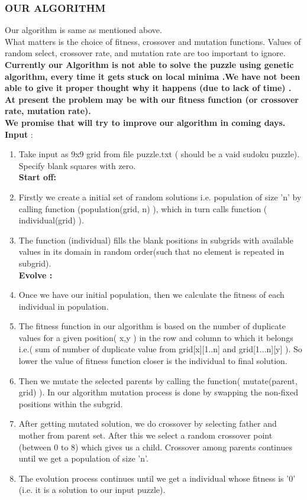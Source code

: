 \documentclass[11pt]{article}
\newcommand\tab[1][1cm]{\hspace*{#1}}
\begin{document}
\subsubsection{OUR ALGORITHM}
\tab Our algorithm is same as mentioned above.\\
\linebreak
What matters is the choice of fitness, crossover and mutation functions. Values of random select, crossover rate, and mutation rate are too important to ignore.\\
\linebreak
	\textbf{Currently our Algorithm is not able to solve the puzzle using genetic algorithm, every time it gets stuck on local minima .We have not been able to give it proper thought why it happens (due to lack of time) . At present the problem may be with our fitness function (or crossover rate, mutation rate).\\
We promise that will try to improve our algorithm in coming days.}\\
\linebreak
\tab \textbf{Input} :
\begin{enumerate}[label = (\roman*)]
\item Take input as 9x9 grid from file puzzle.txt ( should be a vaid sudoku puzzle).
	Specify blank squares with zero.\\
	\textbf{Start off:}
\item Firstly we create a initial set of random solutions i.e. population of size 'n' by calling function (population(grid, n) ), which in turn calls function ( individual(grid) ).
\item The function (individual) fills the blank positions in subgrids with available values in its domain in random order(such that no element is repeated in subgrid).\\
\textbf{Evolve :}
\item Once we have our initial population, then we calculate the fitness of each individual in population.
\item The fitness function in our algorithm is based on the number of duplicate values for a given position( x,y ) in the row and column to which it belongs i.e.( sum of number of duplicate value from grid[x][1..n] and grid[1...n][y] ). So lower the value of fitness function closer is the individual to final solution.
\item Then we mutate the selected parents by calling the function( mutate(parent, grid) ). In our algorithm mutation process is done by swapping the non-fixed positions within the subgrid.
\item After getting mutated solution, we do crossover by selecting father and mother from parent set. After this we select a random crossover point (between 0 to 8) which gives us a child. Crossover among parents continues until we get a population of size 'n'.
\item The evolution process continues until we get a individual whose fitness is '0' (i.e. it is a solution to our input puzzle).
\end{enumerate}
\pagebreak
\end{document}
